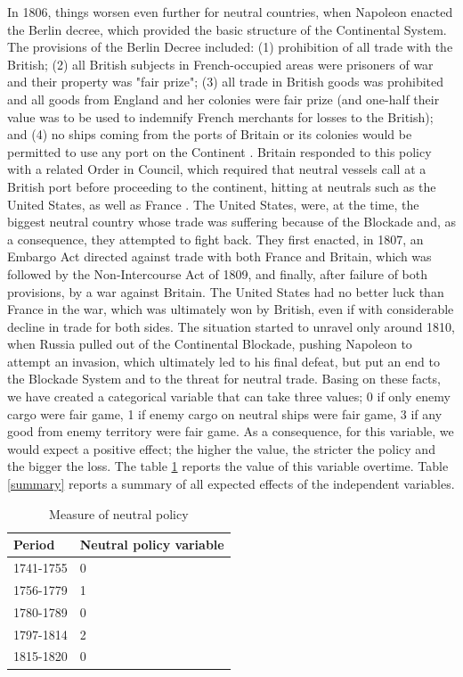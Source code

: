\documentclass[12pt,a4paper,notitlepage,english]{article}
\begin{document}
In 1806, things worsen even further for neutral countries, when Napoleon enacted the Berlin decree, which provided the basic structure of the Continental System.
The provisions of the Berlin Decree included: (1) prohibition of all trade with the British; (2) all British subjects in French-occupied areas were prisoners of war and their property was "fair prize"; (3) all trade in British goods was prohibited and all goods from England and her colonies were fair prize (and one-half their value was to be used to indemnify French merchants for losses to the British); and (4) no ships coming from the ports of Britain or its colonies would be permitted to use any port on the Continent \citep{davis2006naval}.
Britain responded to this policy with a related Order in Council, which required that neutral vessels call at a British port before proceeding to the continent, hitting at neutrals such as the United States, as well as France \citep{davis2006naval}.
The United States, were, at the time, the biggest neutral country whose trade was suffering because of the Blockade and, as a consequence, they attempted to fight back.
They first enacted, in 1807, an Embargo Act directed against trade with both France and Britain, which was followed by the Non-Intercourse Act of 1809, and finally, after failure of both provisions, by a war against Britain.
The United States had no better luck than France in the war, which was ultimately won by British, even if with considerable decline in trade for both sides.
The situation started to unravel only around 1810, when Russia pulled out of the Continental Blockade, pushing Napoleon to attempt an invasion, which ultimately led to his final defeat, but put an end to the Blockade System and to the threat for neutral trade.
Basing on these facts, we have created a categorical variable that can take three values; 0 if only enemy cargo were fair game, 1 if enemy cargo on neutral ships were fair game, 3 if any good from enemy territory  were fair game.
As a consequence, for this variable, we would expect a positive effect; the higher the value, the stricter the policy and the bigger the loss.
The table \ref{neutral_policy} reports the value of this variable overtime.
Table \ref{summary} reports a summary of all expected effects of the independent variables.
\begin{table}[H]
\centering
\caption{Measure of neutral policy}
\label{neutral_policy}
\begin{tabular}{ll}
\hline \hline
Period & Neutral policy variable  \\ \hline
1741-1755 & 0                  \\
1756-1779 & 1       \\
1780-1789 & 0                 \\
1797-1814 & 2                 \\
1815-1820 & 0                 \\
\hline 
\end{tabular}
\end{table}
\end{document}
